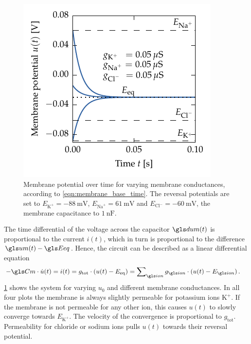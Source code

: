 \begin{figure}
	\includegraphics[trim=0.75cm 0.1cm 0.25cm 0.1cm,clip]{media/chp2/base_membrane_eq4.pdf}
	\caption[Membrane potential over time for varying membrane conductances]{Membrane potential over time for varying membrane conductances, according to \cref{eqn:membrane_base_time}. The reversal potentials are set to $E_{\mathrm{K}^+} = \SI{-88}{\milli\volt}$, $E_{\mathrm{Na}^+} = \SI{61}{\milli\volt}$ and $E_{\mathrm{Cl}^-} = -\SI{60}{\milli\volt}$, the membrane capacitance \Cm to $\SI{1}{\nano\farad}$.}
	\label{fig:membrane_base_time}
\end{figure}
The time differential of the voltage across the capacitor \(\dum(t)\) is proportional to the current $i(t)$, which in turn is proportional to the difference \(\um(t) - \Eeq\). Hence, the circuit can be described as a linear differential equation
\begin{align}
	- \Cm \cdot \dot u(t) = i(t)
		&= g_{\mathrm{tot}} \cdot (u(t) - E_{\mathrm{eq}})
		 = \sum\nolimits_{\ion} g_{\ion} \cdot (u(t) - E_{\ion}) \,.
	\label{eqn:membrane_base_time}
\end{align}
\cref{fig:membrane_base_time} shows the system for varying $u_0$ and different membrane conductances. In all four plots the membrane is always slightly permeable for potassium ions \(\mathrm{K}^+\). If the membrane is not permeable for any other ion, this causes \(u(t)\) to slowly converge towards \(E_{\mathrm{K}^+}\). The velocity of the convergence is proportional to \(g_{\mathrm{tot}}\). Permeability for chloride or sodium ions pulls \(u(t)\) towards their reversal potential.

